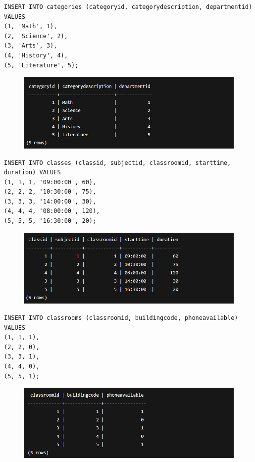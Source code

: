 \documentclass{article}
\begin{document}
\begin{Verbatim}[frame=single,framerule=1pt,fontfamily=courier,fontsize=\small]
INSERT INTO categories (categoryid, categorydescription, departmentid) VALUES 
(1, 'Math', 1),
(2, 'Science', 2),
(3, 'Arts', 3),
(4, 'History', 4),
(5, 'Literature', 5);
\end{Verbatim}
\begin{figure}[H]
    \centering
    \includegraphics[width=\textwidth]{select/categories.png}
\end{figure}

\begin{Verbatim}[frame=single,framerule=1pt,fontfamily=courier,fontsize=\small]
INSERT INTO classes (classid, subjectid, classroomid, starttime, duration) VALUES 
(1, 1, 1, '09:00:00', 60),
(2, 2, 2, '10:30:00', 75),
(3, 3, 3, '14:00:00', 30),
(4, 4, 4, '08:00:00', 120),
(5, 5, 5, '16:30:00', 20);
\end{Verbatim}
\begin{figure}[H]
    \centering
    \includegraphics[width=\textwidth]{select/classes.png}
\end{figure}

\begin{Verbatim}[frame=single,framerule=1pt,fontfamily=courier,fontsize=\small]
INSERT INTO classrooms (classroomid, buildingcode, phoneavailable) VALUES 
(1, 1, 1),
(2, 2, 0),
(3, 3, 1),
(4, 4, 0),
(5, 5, 1);
\end{Verbatim}
\begin{figure}[H]
    \centering
    \includegraphics[width=\textwidth]{select/classrooms.png}
\end{figure}
\end{document}
